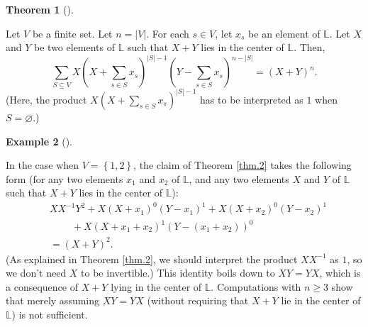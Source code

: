 \documentclass[numbers=enddot,12pt,final,onecolumn,notitlepage]{scrartcl}%
\theoremstyle{definition}
\newtheorem{theo}{Theorem}[section]
\newenvironment{theorem}[1][]
{\begin{theo}[#1]\begin{leftbar}}
{\end{leftbar}\end{theo}}
\newtheorem{exam}[theo]{Example}
\newenvironment{example}[1][]
{\begin{exam}[#1]\begin{leftbar}}
{\end{leftbar}\end{exam}}
\let\sumnonlimits\sum
\renewcommand{\sum}{\sumnonlimits\limits}
\begin{document}
\begin{theorem}
\label{thm.2}Let $V$ be a finite set. Let $n=\left\vert V\right\vert $. For
each $s\in V$, let $x_{s}$ be an element of $\mathbb{L}$. Let $X$ and $Y$ be
two elements of $\mathbb{L}$ such that $X+Y$ lies in the center of
$\mathbb{L}$. Then,%
\[
\sum_{S\subseteq V}X\left(  X+\sum_{s\in S}x_{s}\right)  ^{\left\vert
S\right\vert -1}\left(  Y-\sum_{s\in S}x_{s}\right)  ^{n-\left\vert
S\right\vert }=\left(  X+Y\right)  ^{n}.
\]
(Here, the product $X\left(  X+\sum_{s\in S}x_{s}\right)  ^{\left\vert
S\right\vert -1}$ has to be interpreted as $1$ when $S=\varnothing$.)
\end{theorem}

\begin{example}
In the case when $V=\left\{  1,2\right\}  $, the claim of Theorem \ref{thm.2}
takes the following form (for any two elements $x_{1}$ and $x_{2}$ of
$\mathbb{L}$, and any two elements $X$ and $Y$ of $\mathbb{L}$ such that $X+Y$
lies in the center of $\mathbb{L}$):%
\begin{align*}
&  XX^{-1}Y^{2}+X\left(  X+x_{1}\right)  ^{0}\left(  Y-x_{1}\right)
^{1}+X\left(  X+x_{2}\right)  ^{0}\left(  Y-x_{2}\right)  ^{1}\\
&  \ \ \ \ \ \ \ \ \ \ +X\left(  X+x_{1}+x_{2}\right)  ^{1}\left(  Y-\left(
x_{1}+x_{2}\right)  \right)  ^{0}\\
&  =\left(  X+Y\right)  ^{2}.
\end{align*}
(As explained in Theorem \ref{thm.2}, we should interpret the product
$XX^{-1}$ as $1$, so we don't need $X$ to be invertible.) This identity boils
down to $XY=YX$, which is a consequence of $X+Y$ lying in the center of
$\mathbb{L}$. Computations with $n\geq3$ show that merely assuming $XY=YX$
(without requiring that $X+Y$ lie in the center of $\mathbb{L}$) is not sufficient.
\end{example}
\end{document}

